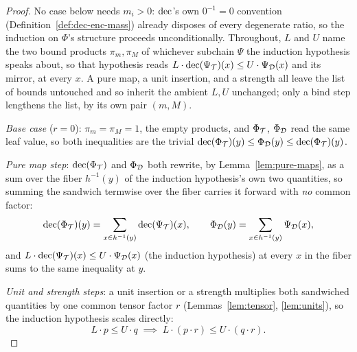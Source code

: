 \begin{proof}
\leanok
No case below needs $m_i > 0$: $\mathrm{dec}$'s own $0^{-1} = 0$ convention
(Definition~\ref{def:dec-enc-mass}) already disposes of every
degenerate ratio, so the induction on $\Phi$'s structure proceeds
unconditionally. Throughout, $L$ and $U$ name the two bound products
$\pi_m,\pi_M$ of whichever subchain $\Psi$ the induction hypothesis
speaks about, so that hypothesis reads
$L\cdot\mathrm{dec}(\Psi_{\mathcal T})(x) \le U\cdot\Psi_{\mathcal D}(x)$ and its mirror,
at every $x$. A pure map, a unit insertion, and a strength all leave
the list of bounds untouched and so inherit the ambient $L,U$
unchanged; only a bind step lengthens the list, by its own pair
$(m,M)$.

\emph{Base case} ($r = 0$): $\pi_m = \pi_M = 1$, the empty products,
and $\Phi_{\mathcal T}$, $\Phi_{\mathcal D}$ read the same leaf value, so both
inequalities are the trivial
$\mathrm{dec}(\Phi_{\mathcal T})(y) \le \Phi_{\mathcal D}(y) \le \mathrm{dec}(\Phi_{\mathcal T})(y)$.

\emph{Pure map step}: $\mathrm{dec}(\Phi_{\mathcal T})$ and $\Phi_{\mathcal D}$ both
rewrite, by Lemma~\ref{lem:pure-maps}, as a sum over the fiber
$h^{-1}(y)$ of the induction hypothesis's own two quantities, so
summing the sandwich termwise over the fiber carries it forward with
\emph{no} common factor:
\[
  \mathrm{dec}(\Phi_{\mathcal T})(y) = \sum_{x \in h^{-1}(y)} \mathrm{dec}(\Psi_{\mathcal T})(x),
  \qquad
  \Phi_{\mathcal D}(y) = \sum_{x \in h^{-1}(y)} \Psi_{\mathcal D}(x),
\]
and $L\cdot\mathrm{dec}(\Psi_{\mathcal T})(x) \le U\cdot\Psi_{\mathcal D}(x)$ (the
induction hypothesis) at every $x$ in the fiber sums to the same
inequality at $y$.

\emph{Unit and strength steps}: a unit insertion or a strength
multiplies both sandwiched quantities by one common tensor factor $r$
(Lemmas~\ref{lem:tensor}, \ref{lem:units}), so the induction
hypothesis scales directly:
\[
  L \cdot p \le U \cdot q \;\implies\; L \cdot (p \cdot r) \le U \cdot (q \cdot r).
\]


\end{proof}
